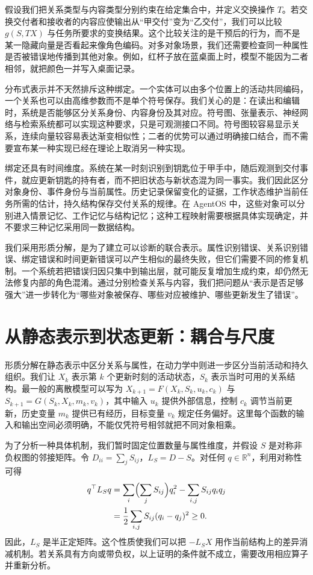 假设我们把关系类型与内容类型分别约束在给定集合中，并定义交换操作 $T$。若交换交付者和接收者的内容应使输出从“甲交付”变为“乙交付”，我们可以比较 $g(S,TX)$ 与任务所要求的变换结果。这个比较关注的是干预后的行为，而不是某一隐藏向量是否看起来像角色编码。对多对象场景，我们还需要检查同一种属性是否被错误地传播到其他对象。例如，红杯子放在蓝桌面上时，模型不能因为二者相邻，就把颜色一并写入桌面记录。

分布式表示并不天然排斥这种绑定。一个实体可以由多个位置上的活动共同编码，一个关系也可以由高维参数而不是单个符号保存。我们关心的是：在读出和编辑时，系统是否能够区分关系身份、内容身份及其对应。符号图、张量表示、神经网络与检索系统都可以实现这种要求，只是可观测接口不同。符号图较容易显示关系，连续向量较容易表达渐变相似性；二者的优势可以通过明确接口结合，而不需要宣布某一种实现已经在理论上取消另一种实现。

绑定还具有时间维度。系统在某一时刻识别到钥匙位于甲手中，随后观测到交付事件，就应更新钥匙的持有者，而不把旧状态与新状态混为同一事实。我们因此区分对象身份、事件身份与当前属性。历史记录保留变化的证据，工作状态维护当前任务所需的估计，持久结构保存交付关系的规律。在 AgentOS 中，这些对象可以分别进入情景记忆、工作记忆与结构记忆；这种工程映射需要根据具体实现确定，并不要求三种记忆采用同一数据结构。

我们采用形质分解，是为了建立可以诊断的联合表示。属性识别错误、关系识别错误、绑定错误和时间更新错误可以产生相似的最终失败，但它们需要不同的修复机制。一个系统若把错误归因只集中到输出层，就可能反复增加生成约束，却仍然无法修复内部的角色混淆。通过分别检查关系与内容，我们把问题从“表示是否足够强大”进一步转化为“哪些对象被保存、哪些对应被维护、哪些更新发生了错误”。

\section{从静态表示到状态更新：耦合与尺度}

形质分解在静态表示中区分关系与属性，在动力学中则进一步区分当前活动和持久组织。我们让 $X_k$ 表示第 $k$ 个更新时刻的活动状态，$S_k$ 表示当时可用的关系结构。最一般的离散模型可以写为 $X_{k+1}=F(X_k,S_k,u_k,c_k)$ 与 $S_{k+1}=G(S_k,X_k,m_k,v_k)$，其中输入 $u_k$ 提供外部信息，控制 $c_k$ 调节当前更新，历史变量 $m_k$ 提供已有经历，目标变量 $v_k$ 规定任务偏好。这里每个函数的输入和输出空间必须明确，不能仅凭符号相邻就把不同对象相乘。

为了分析一种具体机制，我们暂时固定位置数量与属性维度，并假设 $S$ 是对称非负权图的邻接矩阵。令 $D_{ii}=\sum_j S_{ij}$，$L_S=D-S$。对任何 $q\in\mathbb{R}^n$，利用对称性可得
\begin{align}
 q^\top L_Sq
 &=\sum_i\Bigl(\sum_j S_{ij}\Bigr)q_i^2-\sum_{i,j}S_{ij}q_iq_j\\
 &=\frac12\sum_{i,j}S_{ij}(q_i-q_j)^2\geq0.
\end{align}
因此，$L_S$ 是半正定矩阵。这个性质使我们可以把 $-L_SX$ 用作当前结构上的差异消减机制。若关系具有方向或带负权，以上证明的条件就不成立，需要改用相应算子并重新分析。

